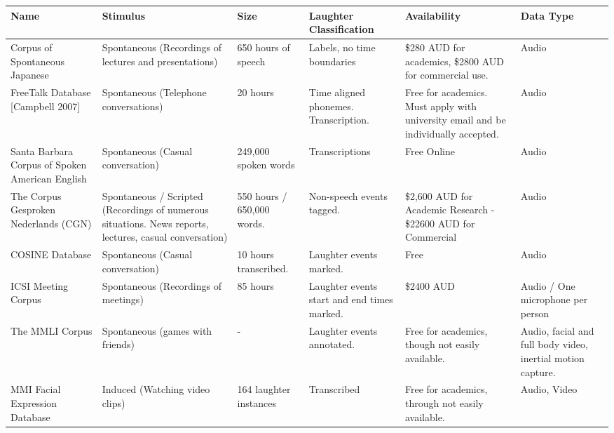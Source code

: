\documentclass[a4paper,11pt,notitlepage]{article}
\begin{document}
\begin{landscape}
\renewcommand\arraystretch{1.5}
\begin{longtable}{|p{3cm}|p{4cm}|p{2cm}|p{3cm}|p{3.5cm}|p{3cm}|}
\hline
\textbf{Name} & \textbf{Stimulus} & \textbf{Size} & \textbf{Laughter Classification} & \textbf{Availability} & \textbf{Data Type} \\ \hline \hline
Corpus of Spontaneous Japanese & Spontaneous (Recordings of lectures and presentations) & 650 hours of speech & Labels, no time boundaries & \$280 AUD for academics, \$2800 AUD for commercial use. & Audio \\ \hline

FreeTalk Database {[}Campbell 2007{]} & Spontaneous (Telephone conversations) & 20 hours & Time aligned phonemes. Transcription. & Free for academics. Must apply with university email and be individually accepted. & Audio \\ \hline

Santa Barbara Corpus of Spoken American English & Spontaneous (Casual conversation) & 249,000 spoken words & Transcriptions & Free Online & Audio \\ \hline

The Corpus Gesproken Nederlands (CGN) & Spontaneous / Scripted (Recordings of numerous situations. News reports, lectures, casual conversation) & 550 hours / 650,000 words. & Non-speech events tagged. & \$2,600 AUD for Academic Research - \$22600 AUD for Commercial & Audio \\ \hline

COSINE Database & Spontaneous (Casual conversation) & 10 hours transcribed. & Laughter events marked. & Free & Audio \\ \hline

ICSI Meeting Corpus & Spontaneous (Recordings of meetings) & 85 hours & Laughter events start and end times marked. & \$2400 AUD & Audio / One microphone per person \\ \hline

The MMLI Corpus & Spontaneous (games with friends) & - & Laughter events annotated. & Free for academics, though not easily available. & Audio, facial and full body video, inertial motion capture. \\ \hline

MMI Facial Expression Database & Induced (Watching video clips) & 164 laughter instances & Transcribed & Free for academics, through not easily available. & Audio, Video \\ \hline


\end{longtable}
\end{landscape}
\end{document}
